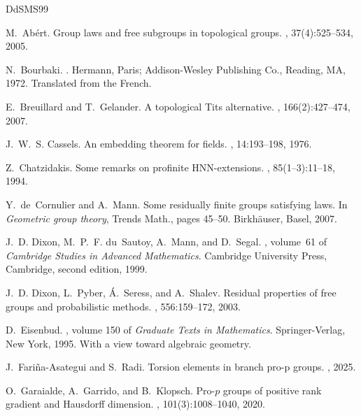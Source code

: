 \documentclass[a4paper,10pt]{amsart}
\theoremstyle{plain}
\theoremstyle{definition}
\numberwithin{equation}{section}
\begin{document}
\begin{thebibliography}{DdSMS99}

M.~Ab{\'e}rt.
\newblock Group laws and free subgroups in topological groups.
, 37(4):525--534, 2005.

N.~Bourbaki.
.
\newblock Hermann, Paris; Addison-Wesley Publishing Co., Reading, MA, 1972.
\newblock Translated from the French.

E.~Breuillard and T.~Gelander.
\newblock A topological {T}its alternative.
, 166(2):427--474, 2007.


J.~W.~S. Cassels.
\newblock An embedding theorem for fields.
, 14:193--198, 1976.

Z.~Chatzidakis.
\newblock Some remarks on profinite HNN-extensions.
, 85(1--3):11--18, 1994.

Y.~de~Cornulier and A.~Mann.
\newblock Some residually finite groups satisfying laws.
\newblock In {\em Geometric group theory}, Trends Math., pages 45--50. Birkh{\"a}user, Basel, 2007.

J.~D. Dixon, M.~P.~F. du~Sautoy, A.~Mann, and D.~Segal.
, volume~61 of {\em Cambridge Studies in Advanced Mathematics}.
\newblock Cambridge University Press, Cambridge, second edition, 1999.

J.~D. Dixon, L.~Pyber, {\'A}.~Seress, and A.~Shalev.
\newblock Residual properties of free groups and probabilistic methods.
, 556:159--172, 2003.

D.~Eisenbud.
, volume 150 of {\em Graduate Texts in Mathematics}.
\newblock Springer-Verlag, New York, 1995.
\newblock With a view toward algebraic geometry.

J.~Fariña-Asategui and S.~Radi.
\newblock Torsion elements in branch pro-p groups.
, 2025.

O.~Garaialde, A.~Garrido, and B.~Klopsch.
\newblock Pro-{$p$} groups of positive rank gradient and {H}ausdorff dimension.
, 101(3):1008--1040, 2020.


\end{thebibliography}
\end{document}
